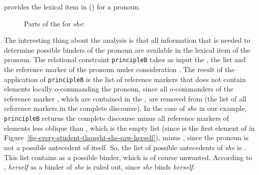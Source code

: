 \documentclass[output=paper,biblatex,babelshorthands,newtxmath,draftmode,colorlinks,citecolor=brown]{langscibook}
\begin{document}
\citet[]{Branco2002a} provides the lexical item in () for a pronoun.
\begin{figure}
\ea
Parts of the \synsemv for \emph{she}:\\
\z
\vspace{-1.5\baselineskip}
\end{figure}
The interesting thing about the analysis is that all information that is needed to determine
possible binders of the pronoun are available in the lexical item of the pronoun. The relational
constraint \texttt{principleB} takes as input the \listal {}, the \listu list  and the reference marker
of the pronoun under consideration . The result of the application of \texttt{principleB} is the list
of reference markers that does not contain elements locally o-commanding the pronoun, since all
o-commanders of the reference marker , which are contained in the \lista, are removed from \listu (the
list of all reference markers in the complete discourse). In the case of \emph{she} in our example,
\texttt{principleB} returns the complete discourse  minus all reference markers of elements less oblique than , which is the empty
list (since  is the first element of  in
Figure~\ref{fig-every-student-thought-she-saw-herself}), minus , since the pronoun is not a
possible antecedent of itself. So, the list of possible antecedents of \emph{she} is . This list contains  as a possible binder, which
is of course unwanted. According to \citet[]{Branco2002a}, \emph{herself} as a binder of
\emph{she} is ruled out, since \emph{she} binds \emph{herself}.
\end{document}
